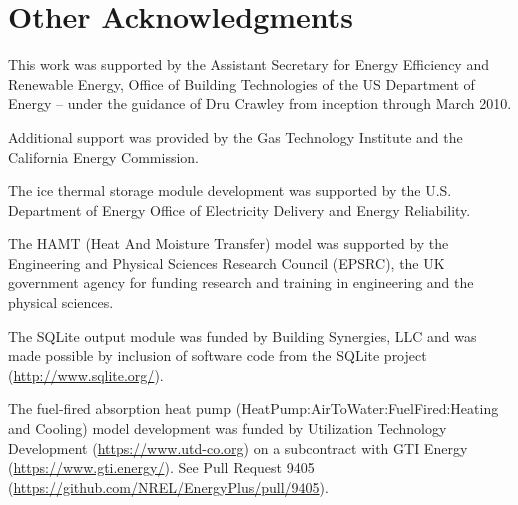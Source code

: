 \section{Other Acknowledgments}\label{other-acknowledgments}

This work was supported by the Assistant Secretary for Energy Efficiency and Renewable Energy, Office of Building Technologies of the US Department of Energy -- under the guidance of Dru Crawley from inception through March 2010.

Additional support was provided by the Gas Technology Institute and the California Energy Commission.

The ice thermal storage module development was supported by the U.S. Department of Energy Office of Electricity Delivery and Energy Reliability.

The HAMT (Heat And Moisture Transfer) model was supported by the Engineering and Physical Sciences Research Council (EPSRC), the UK government agency for funding research and training in engineering and the physical sciences.

The SQLite output module was funded by Building Synergies, LLC and was made possible by inclusion of software code from the SQLite project (\url{http://www.sqlite.org/}).

The fuel-fired absorption heat pump (HeatPump:AirToWater:FuelFired:Heating and Cooling) model development was funded by Utilization Technology Development (\url{https://www.utd-co.org}) on a subcontract with GTI Energy (\url{https://www.gti.energy/}). See Pull Request 9405 (\url{https://github.com/NREL/EnergyPlus/pull/9405}).